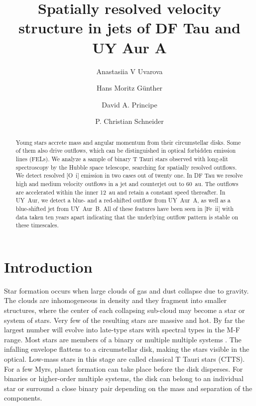 \documentclass[twocolumn,trackchanges]{aastex62}
\begin{document}
\title{Spatially resolved velocity structure in jets of DF Tau and UY Aur A}



\author{Anastasiia V Uvarova}

\author[0000-0003-4243-2840]{Hans Moritz G\"unther}

\author{David A. Principe}

\author{P. Christian Schneider}

\begin{abstract}
Young stars accrete mass and angular momentum from their circumstellar
disks. Some of them also drive outflows, which can be distinguished in
optical forbidden emission lines (FELs). We analyze a sample of binary
T Tauri stars observed with long-slit spectroscopy by the Hubble space
telescope, searching for spatially resolved outflows. We detect resolved [O~{\sc i}] emission in two cases out of twenty one. In DF Tau we resolve high and medium velocity outflows in a jet and counterjet out to 60~au. The outflows are accelerated within the inner 12~au and retain a constant speed thereafter. In UY~Aur, we detect a blue- and a red-shifted outflow from UY~Aur~A, as well as a blue-shifted jet from UY~Aur~B. All of these features have been seen in [Fe~{\sc ii}] with data taken ten years apart indicating that the underlying outflow pattern is stable on these timescales.
\end{abstract}%


\section{Introduction}
\label{sect:intro}
Star formation occurs when large clouds of gas and dust collapse due to
gravity. The clouds are inhomogeneous in density and they fragment into
smaller structures, where the center of each collapsing sub-cloud may
become a star or system of stars. Very few of the resulting stars are
massive and hot. By far the largest number will evolve into late-type
stars with spectral types in the M-F range. Most stars are members of a binary or multiple multiple systems \citep[see e.g.\ review by][]{2007prpl.conf..379D}.
The infalling envelope
flattens to a circumstellar disk, making the stars visible in the
optical. Low-mass stars in this stage are called classical T Tauri stars
(CTTS). For a few Myrs, planet formation can take place before the disk
disperses. For binaries or higher-order multiple systems, the disk can
belong to an individual star or surround a close binary pair depending
on the mass and separation of the components.
\end{document}
